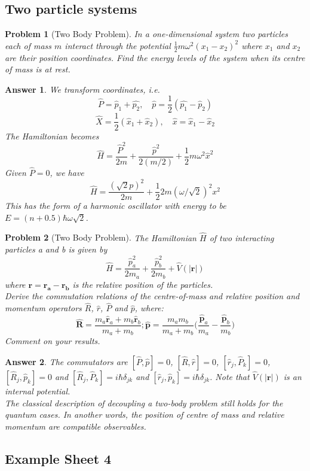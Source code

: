 \documentclass[a4paper]{article}
\newtheorem{ans}{Answer}[section]
\theoremstyle{new}
\newtheorem{qns}{Problem}[section]
\begin{document}
\subsection*{Two particle systems}
\begin{qns}[Two Body Problem]
In a one-dimensional system two particles each of mass $m$ interact through the potential $\frac{1}{2}m\omega^2(x_1-x_2)^2$ where $x_1$ and $x_2$ are their position coordinates. Find the energy levels of the system when its centre of mass is at rest.
\end{qns}
\begin{ans}
We transform coordinates, i.e.
$$\hat{P}=\hat{p}_1+\hat{p_2},\quad \hat{p}=\frac{1}{2}(\hat{p_1}-\hat{p}_2)$$
$$\hat{X}=\frac{1}{2}(\hat{x}_1+\hat{x}_2),\quad\hat{x}=\hat{x}_1-\hat{x}_2$$
The Hamiltonian becomes
$$\hat{H}=\frac{\hat{P}^2}{2m}+\frac{\hat{p}^2}{2(m/2)}+\frac{1}{2}m\omega^2\hat{x}^2$$
Given $\hat{P}=0$, we have
$$\hat{H}=\frac{(\sqrt{2}p)^2}{2m}+\frac{1}{2}2m(\omega/\sqrt{2})^2x^2$$
This has the form of a harmonic oscillator with energy to be $E=(n+0.5)\hbar\omega\sqrt{2}$.
\end{ans}
\begin{qns}[Two Body Problem]
The Hamiltonian $\hat{H}$ of two interacting particles a and b is given by
$$\hat{H}=\frac{\hat{p}_a^2}{2m_a}+\frac{\hat{p}_b^2}{2m_b}+\hat{V}(|\mathbf{r}|)$$
where $\mathbf{r}=\mathbf{r_a}-\mathbf{r_b}$ is the relative position of the particles. \\[5pt]
Derive the commutation relations of the centre-of-mass and relative position and momentum operators $\hat{R}$, $\hat{r}$, $\hat{P}$ and $\hat{p}$, where:
$$\hat{\mathbf{R}}=\frac{m_a\hat{\mathbf{r}}_a+m_b\hat{\mathbf{r}}_b}{m_a+m_b};\hat{\mathbf{p}}=\frac{m_am_b}{m_a+m_b}\bigg(\frac{\hat{\mathbf{p}}_a}{m_a}-\frac{\hat{\mathbf{p}}_b}{m_b}\bigg)$$
Comment on your results.
\end{qns}
\begin{ans}
The commutators are $[\hat{P},\hat{p}]=0$, $[\hat{R},\hat{r}]=0$, $[\hat{r}_j,\hat{P}_k]=0$, $[\hat{R}_j,\hat{p}_k]=0$ and $[\hat{R}_j,\hat{P}_k]=i\hbar\delta_{jk}$ and $[\hat{r}_j,\hat{p}_k]=i\hbar\delta_{jk}$. Note that $\hat{V}(|\mathbf{r}|)$ is an internal potential.\\[5pt]
The classical description of decoupling a two-body problem still holds for the quantum cases. In another words, the position of centre of mass and relative momentum are compatible observables.
\end{ans}
\newpage
\subsection{Example Sheet 4}
\end{document}
